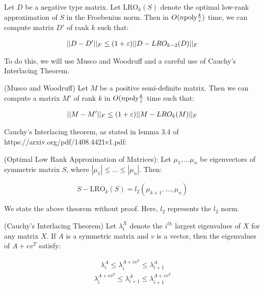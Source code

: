 
\newcommand\LRO{\text{LRO}}



\begin{theorem}
Let $D$ be a negative type matrix. Let $\LRO_k(S)$ denote the optimal
low-rank approximation of $S$ in the Froebenius norm. Then in 
$O(n \text{poly}\frac{k}{\varepsilon})$ time, we can compute matrix $D'$ of
rank $k$ such
that:

\begin{align}
||D-D'||_F \leq (1+\varepsilon)||D-LRO_{k-2}(D)||_F
\end{align}

\end{theorem}

To do this, we will use Musco and Woodruff and a careful use of Cauchy's
Interlacing Theorem.
\begin{theorem} (Musco and Woodruff)
  \label{thm:psd-approx}
  Let $M$ be a positive semi-definite matrix. Then we can compute a matrix
  $M'$ of rank $k$ in $O(n\text{poly}\frac{k}{\varepsilon}$ time such that:

  \begin{align}
    ||M-M'||_F \leq (1+\varepsilon)||M-LRO_k(M)||_F
  \end{align}
\end{theorem}
Cauchy's Interlacing theorem, as stated in
lemma 3.4 of https://arxiv.org/pdf/1408.4421v1.pdf:

\begin{theorem} (Optimal Low Rank Approximation of Matrices):
Let $\mu_1, \ldots \mu_n$ be eigenvectors of symmetric matrix $S$, where
 $|\mu_1| \leq \ldots \leq |\mu_n|$. Then:

 \[S - \LRO_k(S) = l_2(\mu_{k+1}, \ldots, \mu_n) \]
\end{theorem}

 We state the above theorem without proof. Here, $l_2$ represents the
 $l_2$ norm.
\begin{theorem} (Cauchy's Interlacing Theorem)
\label{thm:interlacing}
Let $\lambda^X_i$ denote the $i^{th}$ largest eigenvalues of $X$ for any
matrix $X$.
If $A$ is a symmetric matrix and $v$ is a vector, then the eigenvalues
of $A + vv^T$ satisfy:

\begin{align}
\lambda^A_{i} \leq \lambda^{A+vv^T}_i \leq \lambda^{A}_{i+1}
\end{align}
\begin{align}
\lambda^{A+vv^T}_{i} \leq \lambda^{A}_{i+1} \leq \lambda^{A+vv^T}_{i+1}
\end{align}

\end{theorem}

